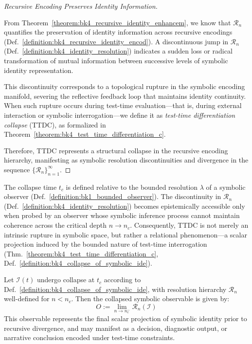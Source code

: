 \begin{proof}[Recursive Encoding Preserves Identity Information]
\label{proof:bk4_recursive_identity_preservation}
\leavevmode

From Theorem~\ref{theorem:bk4_recursive_identity_enhancem}, we know that $\mathcal{R}_n$ quantifies the preservation of identity information across recursive encodings (Def.~\ref{definition:bk4_recursive_identity_encod}). A discontinuous jump in $\mathcal{R}_n$ (Def.~\ref{definition:bk4_identity_resolution}) indicates a sudden loss or radical transformation of mutual information between successive levels of symbolic identity representation.

This discontinuity corresponds to a topological rupture in the symbolic encoding manifold, severing the reflective feedback loop that maintains identity continuity. When such rupture occurs during test-time evaluation---that is, during external interaction or symbolic interrogation---we define it as \emph{test-time differentiation collapse} (TTDC), as formalized in Theorem~\ref{theorem:bk4_test_time_differentiation_c}.

Therefore, TTDC represents a structural collapse in the recursive encoding hierarchy, manifesting as symbolic resolution discontinuities and divergence in the sequence $\{\mathcal{R}_n\}_{n=1}^{\infty}$.
\end{proof}

\begin{remark}
\label{remark:bk4_observer_relative_ttdc}
The collapse time $t_c$ is defined relative to the bounded resolution $\lambda$ of a symbolic observer (Def.~\ref{definition:bk1_bounded_observer}). The discontinuity in $\mathcal{R}_n$ (Def.~\ref{definition:bk4_identity_resolution}) becomes epistemically accessible only when probed by an observer whose symbolic inference process cannot maintain coherence across the critical depth $n \to n_c$. Consequently, TTDC is not merely an intrinsic rupture in symbolic space, but rather a relational phenomenon---a scalar projection induced by the bounded nature of test-time interrogation (Thm.~\ref{theorem:bk4_test_time_differentiation_c}, Def.~\ref{definition:bk4_collapse_of_symbolic_ide}).
\end{remark}

\begin{lemma}
\label{lemma:bk4_scalar_from_identity_collapse}
Let $\mathcal{I}(t)$ undergo collapse at $t_c$ according to Def.~\ref{definition:bk4_collapse_of_symbolic_ide}, with resolution hierarchy $\mathcal{R}_n$ well-defined for $n < n_c$. Then the collapsed symbolic observable is given by:
\[
O := \lim_{n \to n_c^-} \mathcal{R}_n(\mathcal{I})
\]
This observable represents the final scalar projection of symbolic identity prior to recursive divergence, and may manifest as a decision, diagnostic output, or narrative conclusion encoded under test-time constraints.
\end{lemma}

